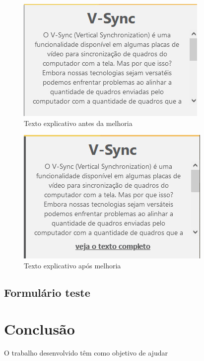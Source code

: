 \documentclass[tcc,capa]{texufpel}
\begin{document}
\begin{figure}[htbp]
  \centering \includegraphics[scale=.3]{Navegacao/antes_texto_explicativo.jpeg}
  \caption{Texto explicativo antes da melhoria}
  \label{antes_texto_explicativo}
\end{figure}

\begin{figure}[htbp]
  \centering \includegraphics[scale=.3]{Navegacao/melhoria_texto_explicativo.jpeg}
  \caption{Texto explicativo após melhoria}
  \label{melhoria_texto_explicativo}
\end{figure}

\section{Formulário teste}

\chapter{Conclusão}
\label{cap: conclusao}

O trabalho desenvolvido têm como objetivo de ajudar 


 




\end{document}
